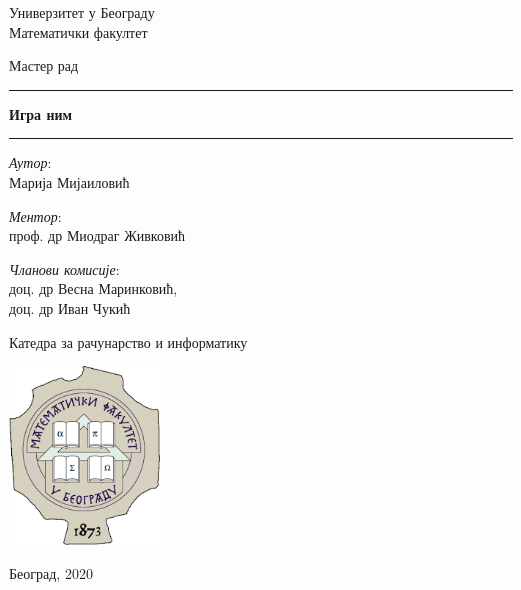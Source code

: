 \begin{titlepage}
    \begin{center}
        \vspace{0.5cm}
        
        \Large{
	        Универзитет у Београду\\
	        Математички факултет\\
        }
    
        \vspace{0.5cm}
        \Large{Мастер рад}    
        
        \vspace{2.0cm}
        
        \Huge
        \rule[0.5cm]{\textwidth}{0.5pt}
        \textbf{Игра ним}
        \rule{\textwidth}{0.5pt}
        \vspace{0.5cm}
        
        \vspace{2.0cm}
        
        \begin{minipage}[t]{0.47\textwidth}
        	\textnormal{\large{\textit{Аутор}:\\}}
        	{\large Марија Мијаиловић}
        \end{minipage}\hfill\begin{minipage}[t]{0.47\textwidth}\raggedleft
        	\textnormal{\large{\textit{Ментор}:\\}}
        	{\large проф. др Миодраг Живковић\\}
        	
        	\vspace*{15pt}
        	
        	{\large{\textit{Чланови комисије}:\\}} 
        	{\large доц. др Весна Маринковић,\\}
        	{\large доц. др Иван Чукић\\}
        \end{minipage}
        
        \vfill
        
        {\Large Катедра за рачунарство и информатику}
        
        \vspace{0.8cm}
        
        \includegraphics[width=0.3\textwidth]{matf_logo.png}
        
        \large{Београд, 2020}
        
    \end{center}
\end{titlepage}